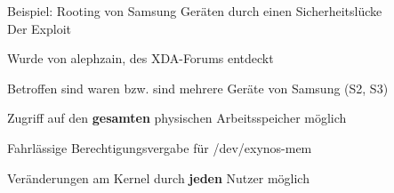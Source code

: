 \begin{frame}
	\centering
	Beispiel: Rooting von Samsung Geräten durch einen Sicherheitslücke\\
	\centering 
	Der Exploit

    		\begin{block}{}
    			Wurde von alephzain, des XDA-Forums entdeckt
    		\end{block}
    		\begin{block}{}
				Betroffen sind waren bzw. sind mehrere Geräte von Samsung (S2, S3)
			\end{block}
			\begin{block}{}
				Zugriff auf den \textbf{gesamten} physischen Arbeitsspeicher möglich
			\end{block}
			\begin{block}{}
				Fahrlässige Berechtigungsvergabe für /dev/exynos-mem
			\end{block}
			\begin{block}{}
				Veränderungen am Kernel durch \textbf{jeden} Nutzer möglich
			\end{block}

\end{frame}